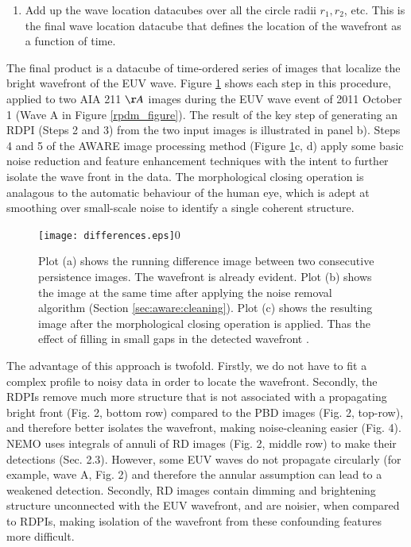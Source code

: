 \begin{enumerate}
\item Add up the wave location datacubes over all the circle radii
  $r_{1}, r_{2}$\textellipsis, etc.  This is the final wave location
  datacube that defines the location of the wavefront as a function of
  time.

\end{enumerate}

The final product is a datacube of time-ordered series of images that
localize the bright wavefront of the EUV wave.  Figure
\ref{method_figure} shows each step in this procedure, applied to two
AIA 211 $\AA$ images during the EUV wave event of 2011 October 1 (Wave
A in Figure \ref{rpdm_figure}).  The result of the key step of
generating an RDPI (Steps 2 and 3) from the two input images is
illustrated in panel b). Steps 4 and 5 of the AWARE image processing
method (Figure \ref{method_figure}c, d) apply some basic noise
reduction and feature enhancement techniques with the intent to
further isolate the wave front in the data. The morphological closing
operation is analagous to the automatic behaviour of the human eye,
which is adept at smoothing over small-scale noise to identify a
single coherent structure.

\begin{figure}
\begin{center}
\texttt{[image: differences.eps]}0
\caption{Plot (a) shows the running difference image between two
  consecutive persistence images. The wavefront is already
  evident. Plot (b) shows the image at the same time after applying
  the noise removal algorithm (Section \ref{sec:aware:cleaning}).
  Plot (c) shows the resulting image after the morphological closing
  operation is applied. Thas the effect of filling in small gaps in
  the detected wavefront \citep[e.g.][]{2002dip..book.....G}.}
\label{method_figure}
\end{center}
\end{figure}

The advantage of this approach is twofold. Firstly, we do not have to
fit a complex profile to noisy data in order to locate the
wavefront. Secondly, the RDPIs remove much more structure that is not
associated with a propagating bright front (Fig. 2, bottom row)
compared to the PBD images (Fig. 2, top-row), and therefore better
isolates the wavefront, making noise-cleaning easier (Fig. 4).  NEMO
\citep{2005SoPh..228..265P} uses integrals of annuli of RD images
(Fig. 2, middle row) to make their detections (Sec. 2.3). However, some
EUV waves do not propagate circularly (for example, wave A, Fig. 2)
and therefore the annular assumption can lead to a weakened detection.
Secondly, RD images contain dimming and brightening structure
unconnected with the EUV wavefront, and are noisier, when compared to
RDPIs, making isolation of the wavefront from these confounding
features more difficult.

